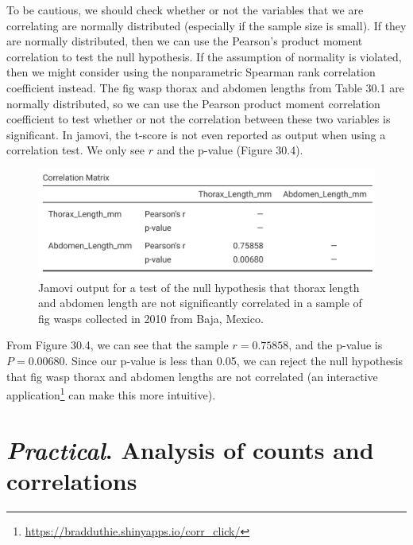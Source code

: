 \documentclass[
]{scrbook}
\begin{document}
To be cautious, we should check whether or not the variables that we are correlating are normally distributed (especially if the sample size is small).
If they are normally distributed, then we can use the Pearson's product moment correlation to test the null hypothesis.
If the assumption of normality is violated, then we might consider using the nonparametric Spearman rank correlation coefficient instead.
The fig wasp thorax and abdomen lengths from Table 30.1 are normally distributed, so we can use the Pearson product moment correlation coefficient to test whether or not the correlation between these two variables is significant.
In jamovi, the t-score is not even reported as output when using a correlation test.
We only see \(r\) and the p-value (Figure 30.4).

\begin{figure}
\includegraphics[width=1\linewidth]{img/Jamovi_correlation_output} \caption{Jamovi output for a test of the null hypothesis that thorax length and abdomen length are not significantly correlated in a sample of fig wasps collected in 2010 from Baja, Mexico.}\label{fig:unnamed-chunk-151}
\end{figure}

From Figure 30.4, we can see that the sample \(r = 0.75858\), and the p-value is \(P = 0.00680\).
Since our p-value is less than 0.05, we can reject the null hypothesis that fig wasp thorax and abdomen lengths are not correlated (an interactive application\footnote{\url{https://bradduthie.shinyapps.io/corr_click/}} can make this more intuitive).

\hypertarget{Chapter_31}{%
\chapter{\texorpdfstring{\emph{Practical}. Analysis of counts and correlations}{Practical. Analysis of counts and correlations}}\label{Chapter_31}}
\end{document}
